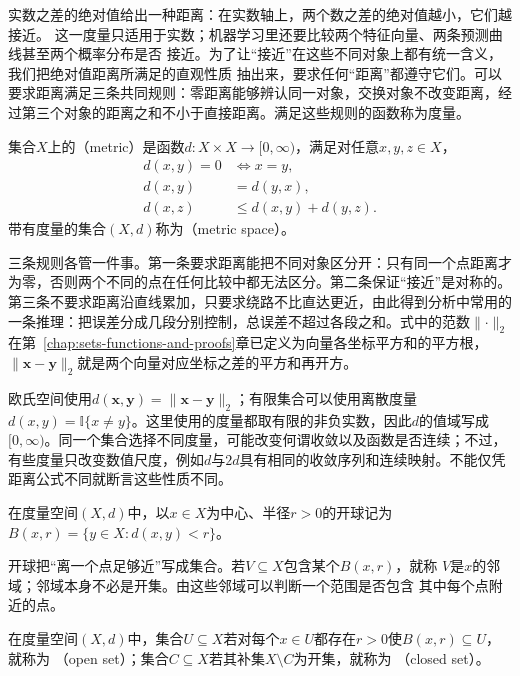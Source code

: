 实数之差的绝对值给出一种距离：在实数轴上，两个数之差的绝对值越小，它们越接近。
这一度量只适用于实数；机器学习里还要比较两个特征向量、两条预测曲线甚至两个概率分布是否
接近。为了让“接近”在这些不同对象上都有统一含义，我们把绝对值距离所满足的直观性质
抽出来，要求任何“距离”都遵守它们。可以要求距离满足三条共同规则：零距离能够辨认同一对象，交换对象不改变距离，经过第三个对象的距离之和不小于直接距离。满足这些规则的函数称为度量。
\begin{definition}[度量与度量空间]
\label{def:analysis-metric-space}
集合$X$上的（metric）是函数$d:X\times X\to[0,\infty)$，满足对任意$x,y,z\in X$，
\[
  \begin{aligned}
    d(x,y)=0&\Longleftrightarrow x=y,\\
    d(x,y)&=d(y,x),\\
    d(x,z)&\leq d(x,y)+d(y,z).
  \end{aligned}
\]
带有度量的集合$(X,d)$称为（metric space）。
\end{definition}
三条规则各管一件事。第一条要求距离能把不同对象区分开：只有同一个点距离才为零，否则两个不同的点在任何比较中都无法区分。第二条保证“接近”是对称的。第三条不要求距离沿直线累加，只要求绕路不比直达更近，由此得到分析中常用的一条推理：把误差分成几段分别控制，总误差不超过各段之和。式中的范数$\lVert\cdot\rVert_2$在第~\ref{chap:sets-functions-and-proofs}章已定义为向量各坐标平方和的平方根，$\lVert\bm{x}-\bm{y}\rVert_2$就是两个向量对应坐标之差的平方和再开方。

欧氏空间使用$d(\bm{x},\bm{y})=\lVert\bm{x}-\bm{y}\rVert_2$；有限集合可以使用离散度量$d(x,y)=\mathbb{I}\{x\neq y\}$。这里使用的度量都取有限的非负实数，因此$d$的值域写成$[0,\infty)$。同一个集合选择不同度量，可能改变何谓收敛以及函数是否连续；不过，有些度量只改变数值尺度，例如$d$与$2d$具有相同的收敛序列和连续映射。不能仅凭距离公式不同就断言这些性质不同。

\begin{definition}[开球]
\label{def:analysis-open-ball}
在度量空间$(X,d)$中，以$x\in X$为中心、半径$r>0$的开球记为
$B(x,r)=\{y\in X:d(x,y)<r\}$。
\end{definition}

开球把“离一个点足够近”写成集合。若$V\subseteq X$包含某个$B(x,r)$，就称
$V$是$x$的邻域；邻域本身不必是开集。由这些邻域可以判断一个范围是否包含
其中每个点附近的点。

\begin{definition}[开集与闭集]
\label{def:analysis-open-closed-sets}
在度量空间$(X,d)$中，集合$U\subseteq X$若对每个$x\in U$都存在$r>0$使$B(x,r)\subseteq U$，就称为
（open set）；集合$C\subseteq X$若其补集$X\setminus C$为开集，就称为
（closed set）。
\end{definition}

